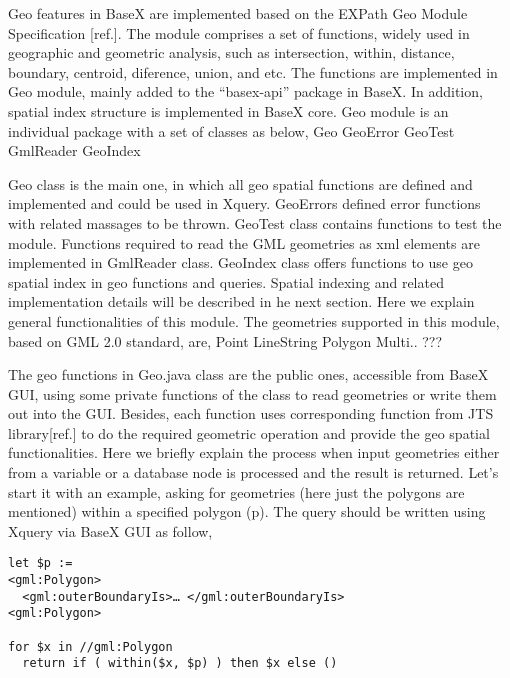 
Geo features in BaseX are implemented based on the EXPath Geo Module Specification [ref.]. The module comprises a set of functions, widely used in geographic and geometric analysis, such as intersection, within, distance, boundary, centroid, diference, union, and etc. The functions are implemented in Geo module, mainly added to the “basex-api” package in BaseX. In addition, spatial index structure is implemented in BaseX core. Geo module is an individual package with a set of classes as below,
Geo
GeoError
GeoTest
GmlReader
GeoIndex

Geo class is the main one, in which all geo spatial functions are defined and implemented and could be used in Xquery. GeoErrors defined error functions with related massages to be thrown. GeoTest class contains functions to test the module. Functions required to read the GML geometries as xml elements are implemented in GmlReader class.  GeoIndex class offers functions to use geo spatial index in geo functions and queries. Spatial indexing and related implementation details will be described in he next section. Here we explain general functionalities of this module.
The geometries supported in this module, based on GML 2.0 standard, are,
Point
LineString
Polygon
Multi.. ???

The geo functions in Geo.java class are the public ones, accessible from BaseX GUI, using some private functions of the class to read geometries or write them out into the GUI. Besides, each function uses corresponding function from JTS library[ref.] to do the required geometric operation and provide the geo spatial functionalities. Here we briefly explain the process when input geometries either from a variable or a database node is processed and the result is returned.
Let's start it with an example, asking for geometries (here just the polygons are mentioned) within a specified polygon (p). The query should be written using Xquery via BaseX GUI as follow,

\begin{verbatim}
let $p := 
<gml:Polygon>
  <gml:outerBoundaryIs>… </gml:outerBoundaryIs>
<gml:Polygon>
	
for $x in //gml:Polygon
  return if ( within($x, $p) ) then $x else ()
\end{verbatim}

